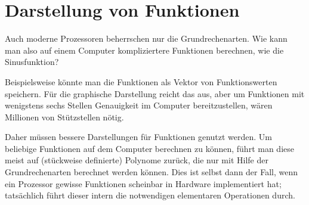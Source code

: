 % 


\chapter{Darstellung von Funktionen}

Auch moderne Prozessoren beherrschen nur die Grundrechenarten. Wie
kann man also auf einem Computer kompliziertere Funktionen berechnen,
wie \zb die Sinusfunktion?

Beispielsweise könnte man die Funktionen als Vektor von
Funktionswerten speichern. Für die graphische Darstellung reicht das
aus, aber um Funktionen mit wenigstens sechs Stellen Genauigkeit im
Computer bereitzustellen, wären Millionen von Stützstellen nötig.

Daher müssen bessere Darstellungen für Funktionen genutzt werden.  Um
beliebige Funktionen auf dem Computer berechnen zu können, führt man
diese meist auf (stückweise definierte) Polynome zurück, die nur mit
Hilfe der Grundrechenarten berechnet werden können. Dies ist selbst
dann der Fall, wenn ein Prozessor gewisse Funktionen scheinbar in
Hardware implementiert hat; tatsächlich führt dieser intern die
notwendigen elementaren Operationen durch.

\section{}
\label{sec:horner}


